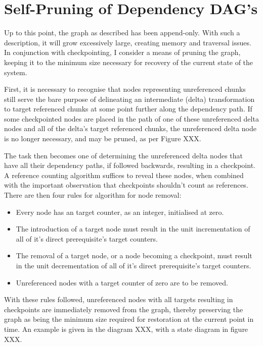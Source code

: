 \documentclass[10pt, a4paper]{article}
\begin{document}
\section{Self-Pruning of Dependency DAG's}

Up to this point, the graph as described has been append-only.
With such a description, it will grow excessively large, creating memory and traversal issues.
In conjunction with checkpointing, I consider a means of pruning the graph, keeping it to the minimum size necessary for recovery of the current state of the system.

First, it is necessary to recognise that nodes representing unreferenced chunks still serve the bare purpose of delineating an intermediate (delta) transformation to target referenced chunks at some point further along the dependency path\cite{mogul2002deltahttp}.
If some checkpointed nodes are placed in the path of one of these unreferenced delta nodes and all of the delta's target referenced chunks, the unreferenced delta node is no longer necessary, and may be pruned, as per Figure XXX.

The task then becomes one of determining the unreferenced delta nodes that have all their dependency paths, if followed backwards, resulting in a checkpoint.
A reference counting algorithm suffices to reveal these nodes, when combined with the important observation that checkpoints shouldn't count as references.
There are then four rules for algorithm for node removal:
\begin{itemize}
	\item Every node has an target counter, as an integer, initialised at zero.
	\item The introduction of a target node must result in the unit incrementation of all of it's direct prerequisite's target counters.
	\item The removal of a target node, or a node becoming a checkpoint, must result in the unit decrementation of all of it's direct prerequisite's target counters.
	\item Unreferenced nodes with a target counter of zero are to be removed.
\end{itemize}
With these rules followed, unreferenced nodes with all targets resulting in checkpoints are immediately removed from the graph, thereby preserving the graph as being the minimum size required for restoration at the current point in time.
An example is given in the diagram XXX, with a state diagram in figure XXX.

\end{document}
